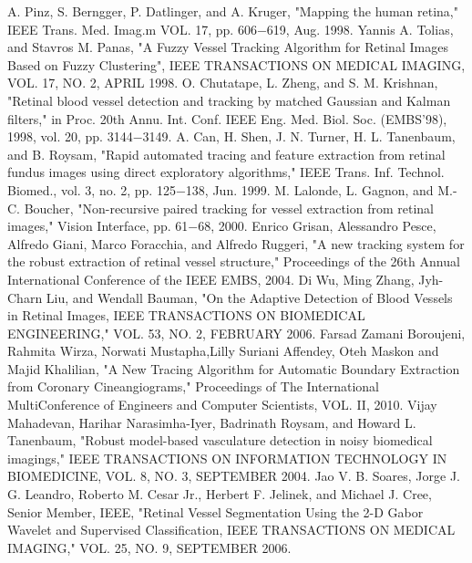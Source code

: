 \begin{thebibliography}{300}
 A. Pinz, S. Berngger, P. Datlinger, and A. Kruger, "Mapping the human retina," IEEE Trans. Med. Imag.m VOL. 17, pp. 606$-$619, Aug. 1998.
 Yannis A. Tolias, and Stavros M. Panas, "A Fuzzy Vessel Tracking Algorithm for Retinal Images Based on Fuzzy Clustering", IEEE TRANSACTIONS ON MEDICAL IMAGING, VOL. 17, NO. 2, APRIL 1998.
 O. Chutatape, L. Zheng, and S. M. Krishnan, "Retinal blood vessel detection and tracking by matched Gaussian and Kalman filters," in Proc. 20th Annu. Int. Conf. IEEE Eng. Med. Biol. Soc. (EMBS'98), 1998, vol. 20, pp. 3144$-$3149.
 A. Can, H. Shen, J. N. Turner, H. L. Tanenbaum, and B. Roysam, "Rapid automated tracing and feature extraction from retinal fundus images using direct exploratory algorithms," IEEE Trans. Inf. Technol. Biomed., vol. 3, no. 2, pp. 125$-$138, Jun. 1999.
 M. Lalonde, L. Gagnon, and M.-C. Boucher, "Non-recursive paired tracking for vessel extraction from retinal images," Vision Interface, pp. 61$-$68, 2000.
 Enrico Grisan, Alessandro Pesce, Alfredo Giani, Marco Foracchia, and Alfredo Ruggeri, "A new tracking system for the robust extraction of retinal vessel structure," Proceedings of the 26th Annual International Conference of the IEEE EMBS, 2004.
 Di Wu, Ming Zhang, Jyh-Charn Liu, and Wendall Bauman, "On the Adaptive Detection of Blood Vessels in Retinal Images, IEEE TRANSACTIONS ON BIOMEDICAL ENGINEERING," VOL. 53, NO. 2, FEBRUARY 2006.
 Farsad Zamani Boroujeni, Rahmita Wirza, Norwati Mustapha,Lilly Suriani Affendey,
Oteh Maskon and Majid Khalilian, "A New Tracing Algorithm for Automatic Boundary Extraction from Coronary Cineangiograms," Proceedings of The International MultiConference of Engineers and Computer Scientists, VOL. II, 2010.
 Vijay Mahadevan, Harihar Narasimha-Iyer, Badrinath Roysam, and Howard L. Tanenbaum, "Robust model-based vasculature detection in noisy biomedical imagings," IEEE TRANSACTIONS ON INFORMATION TECHNOLOGY IN BIOMEDICINE, VOL. 8, NO. 3, SEPTEMBER 2004.
 Jao V. B. Soares, Jorge J. G. Leandro, Roberto M. Cesar Jr., Herbert F. Jelinek, and Michael J. Cree, Senior Member, IEEE, "Retinal Vessel Segmentation Using the 2-D Gabor Wavelet and Supervised Classification, IEEE TRANSACTIONS ON MEDICAL IMAGING," VOL. 25, NO. 9, SEPTEMBER 2006.

\end{thebibliography}
